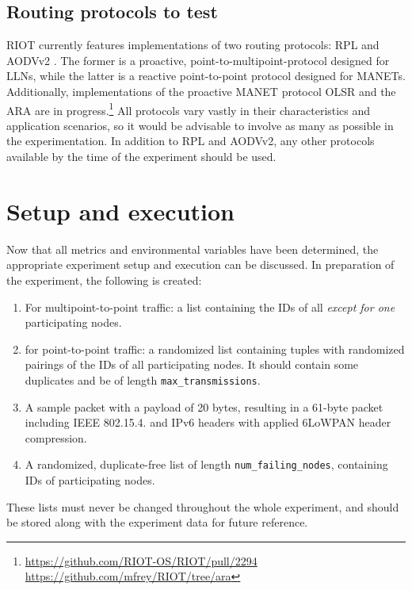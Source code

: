 \documentclass{acm_proc_article-sp}
\begin{document}
\subsection{Routing protocols to test}
\label{subsec:protocols}
RIOT currently features implementations of two routing protocols: RPL \cite{RFC-6550} and AODVv2 \cite{draft-ietf-manet-aodvv2-09}. The former is a proactive, point-to-multipoint-protocol designed for \glspl{LLN}, while the latter is a reactive point-to-point protocol designed for \glspl{MANET}. Additionally, implementations of the proactive \gls{MANET} protocol OLSR\cite{RFC-3626} and the \gls{ARA}\cite{ara} are in progress.\footnote{ \url{https://github.com/RIOT-OS/RIOT/pull/2294}\\  \url{https://github.com/mfrey/RIOT/tree/ara}}
All protocols vary vastly in their characteristics and application scenarios, so it would be advisable to involve as many as possible in the experimentation. In addition to RPL and AODVv2, any other protocols available by the time of the experiment should be used.

\section{Setup and execution}
\label{sec:setup}
Now that all metrics and environmental variables have been determined, the appropriate experiment setup and execution can be discussed.
In preparation of the experiment, the following is created:
\begin{enumerate}
\item For multipoint-to-point traffic: a list containing the IDs of all \emph{except for one} participating nodes.
\item for point-to-point traffic: a randomized list containing tuples with randomized pairings of the IDs of all participating nodes. It should contain some duplicates and be of length \texttt{max\_transmissions}.
\item A sample packet with a payload of 20 bytes, resulting in a 61-byte packet including IEEE 802.15.4. and IPv6 headers with applied 6LoWPAN header compression.
\item A randomized, duplicate-free list of length \texttt{num\_failing\_nodes}, containing IDs of participating nodes.
\end{enumerate}
These lists must never be changed throughout the whole experiment, and should be stored along with the experiment data for future reference.
\end{document}
